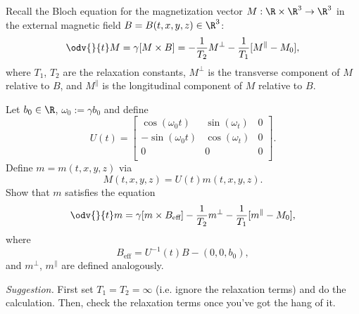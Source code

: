 \begin{problem}[2]
  Recall the Bloch equation for the magnetization vector $M : \R \times \R^3 \to \R^3$ in the external magnetic field $B = B(t, x, y, z) \in \R^3$:
  \[%
    \odv{}{t} M = \gamma[M \times B] = -\frac{1}{T_2}M^{\perp} - \frac{1}{T_1}[M^\parallel - M_0]
  ,\]%
  where $T_1$, $T_2$ are the relaxation constants, $M^\perp$ is the transverse component of $M$ relative to $B$, and $M^\parallel$ is the longitudinal component of $M$ relative to $B$.

  \noindent Let $b_0 \in \R$, $\omega_0 := \gamma b_0$ and define
  \[%
    U(t) = \begin{bmatrix}
      \cos(\omega_0t) & \sin(\omega_t) & 0 \\
      -\sin(\omega_0t) & \cos(\omega_t) & 0 \\
      0 & 0 & 0 \\
    \end{bmatrix}
  .\]%
  Define $m = m(t, x, y, z)$ via
  \[%
    M(t, x, y, z) = U(t)m(t, x, y, z)
  .\]%
  Show that $m$ satisfies the equation
  \[%
    \odv{}{t} m = \gamma[m \times B_{\text{eff}}] - \frac{1}{T_2}m^\perp - \frac{1}{T_1}[m^\parallel - M_0]
  ,\]%
  where
  \[%
    B_{\text{eff}} = U^{-1}(t)B - (0, 0, b_0)
  ,\]%
  and $m^\perp$, $m^\parallel$ are defined analogously.

  \noindent \textit{Suggestion.} First set $T_1 = T_2 = \infty$ (i.e. ignore the relaxation terms) and do the calculation. Then, check the relaxation terms once you've got the hang of it.
\end{problem}

